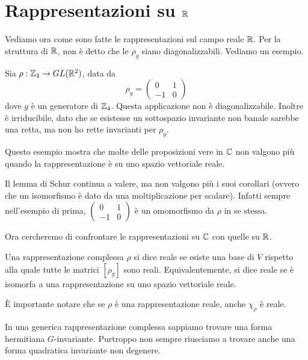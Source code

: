 \section{Rappresentazioni su $\mathbb R$}
	Vediamo ora come sono fatte le rappresentazioni sul campo reale $\mathbb R$. Per la struttura di $\mathbb R$, non è detto che le $\rho_g$ siano diagonalizzabili. Vediamo un esempio.
	
	\begin{myexample}
		Sia $\rho: \mathbb Z_4 \rightarrow GL(\mathbb R^2)$, data da 
			\[
				\rho_g = \left(
					\begin{matrix}
						0 	& 	1 	\\
						-1 	& 	0
					\end{matrix}
				\right)
			\]
		dove $g$ è un generatore di $\mathbb Z_4$. Questa applicazione non è diagonalizzabile. Inoltre è irriducibile, dato che se esistesse un sottospazio invariante non banale sarebbe una retta, ma non ho rette invarianti per $\rho_g$.
	\end{myexample}
	
	Questo esempio mostra che molte delle proposizioni vere in $\mathbb C$ non valgono più quando la rappresentazione è su uno spazio vettoriale reale.
	
	Il lemma di Schur continua a valere, ma non valgono più i suoi corollari (ovvero che un isomorfismo è dato da una moltiplicazione per scalare). Infatti sempre nell'esempio di prima, 
	$
		\left(
			\begin{matrix}
				0 	& 	1 	\\
				-1 	& 	0
			\end{matrix}
		\right)
	$ è un omomorfismo da $\rho$ in se stessa.
	
	Ora cercheremo di confrontare le rappresentazioni su $\mathbb C$ con quelle su $\mathbb R$. 
	
	\begin{mydef}
	 Una rappresentazione complessa $\rho$ si dice reale se esiste una base di $V$ rispetto alla quale tutte le matrici $[\rho_g]$ sono reali. Equivalentemente, si dice reale se è isomorfa a una rappresentazione su uno spazio vettoriale reale.
	\end{mydef}

	È importante notare che se $\rho$ è una rappresentazione reale, anche $\chi_\rho$ è reale.
	
	In una generica rappresentazione complessa sappiamo trovare una forma hermitiana $G$-invariante. Purtroppo non sempre riusciamo a trovare anche una forma quadratica invariante non degenere.
	
